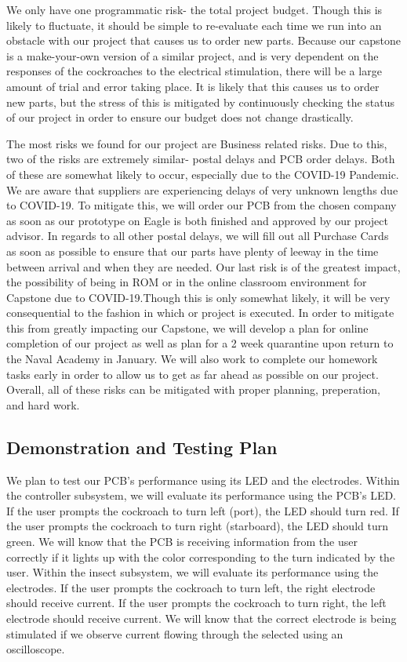 \documentclass{article}
\begin{document}
 We only have one programmatic risk- the total project budget. Though this is likely to fluctuate, it should be simple to re-evaluate each time we run into an obstacle with our project that causes us to order new parts. Because our capstone is a make-your-own version of a similar project, and is very dependent on the responses of the cockroaches to the electrical stimulation, there will be a large amount of trial and error taking place. It is likely that this causes us to order new parts, but the stress of this is mitigated by continuously checking the status of our project in order to ensure our budget does not change drastically. 



 The most risks we found for our project are Business related risks. Due to this, two of the risks are extremely similar- postal delays and PCB order delays. Both of these are somewhat likely to occur, especially due to the COVID-19 Pandemic. We are aware that suppliers are experiencing delays of very unknown lengths due to COVID-19. To mitigate this, we will order our PCB from the chosen company as soon as our prototype on Eagle is both finished and approved by our project advisor. In regards to all other postal delays, we will fill out all Purchase Cards as soon as possible to ensure that our parts have plenty of leeway in the time between arrival and when they are needed. Our last risk is of the greatest impact, the possibility of being in ROM or in the online classroom environment for Capstone due to COVID-19.Though this is only somewhat likely, it will be very consequential to the fashion in which or project is executed. In order to mitigate this from greatly impacting our Capstone, we will develop a plan for online completion of our project as well as plan for a 2 week quarantine upon return to the Naval Academy in January. We will also work to complete our homework tasks early in order to allow us to get as far ahead as possible on our project. Overall, all of these risks can be mitigated with proper planning, preperation, and hard work.



\subsection{Demonstration and Testing Plan}

 We plan to test our PCB's performance using its LED and the electrodes. Within the controller subsystem, we will evaluate its performance using the PCB's LED. If the user prompts the cockroach to turn left (port), the LED should turn red. If the user prompts the cockroach to turn right (starboard), the LED should turn green. We will know that the PCB is receiving information from the user correctly if it lights up with the color corresponding to the turn indicated by the user. Within the insect subsystem, we will evaluate its performance using the electrodes. If the user prompts the cockroach to turn left, the right electrode should receive current. If the user prompts the cockroach to turn right, the left electrode should receive current. We will know that the correct electrode is being stimulated if we observe current flowing through the selected using an oscilloscope.
\end{document}
